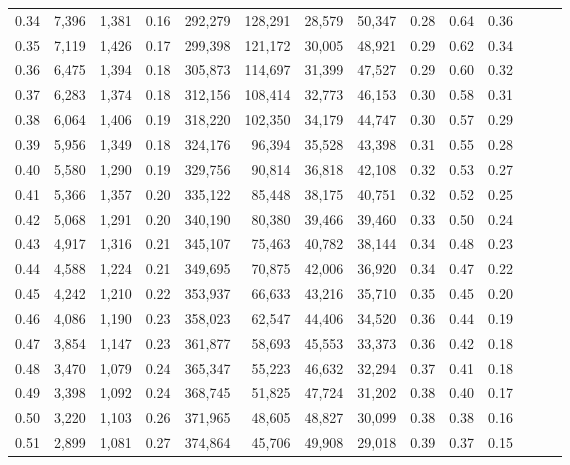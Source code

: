 \begin{tabular}{rrrrrrrrrrrrrr}
0.34 &   7,396 &  1,381 &  0.16 &  292,279 &  128,291 &  28,579 &  50,347 &  0.28 &  0.64 &      0.36 \\
0.35 &   7,119 &  1,426 &  0.17 &  299,398 &  121,172 &  30,005 &  48,921 &  0.29 &  0.62 &      0.34 \\
0.36 &   6,475 &  1,394 &  0.18 &  305,873 &  114,697 &  31,399 &  47,527 &  0.29 &  0.60 &      0.32 \\
0.37 &   6,283 &  1,374 &  0.18 &  312,156 &  108,414 &  32,773 &  46,153 &  0.30 &  0.58 &      0.31 \\
0.38 &   6,064 &  1,406 &  0.19 &  318,220 &  102,350 &  34,179 &  44,747 &  0.30 &  0.57 &      0.29 \\
0.39 &   5,956 &  1,349 &  0.18 &  324,176 &   96,394 &  35,528 &  43,398 &  0.31 &  0.55 &      0.28 \\
0.40 &   5,580 &  1,290 &  0.19 &  329,756 &   90,814 &  36,818 &  42,108 &  0.32 &  0.53 &      0.27 \\
0.41 &   5,366 &  1,357 &  0.20 &  335,122 &   85,448 &  38,175 &  40,751 &  0.32 &  0.52 &      0.25 \\
0.42 &   5,068 &  1,291 &  0.20 &  340,190 &   80,380 &  39,466 &  39,460 &  0.33 &  0.50 &      0.24 \\
0.43 &   4,917 &  1,316 &  0.21 &  345,107 &   75,463 &  40,782 &  38,144 &  0.34 &  0.48 &      0.23 \\
0.44 &   4,588 &  1,224 &  0.21 &  349,695 &   70,875 &  42,006 &  36,920 &  0.34 &  0.47 &      0.22 \\
0.45 &   4,242 &  1,210 &  0.22 &  353,937 &   66,633 &  43,216 &  35,710 &  0.35 &  0.45 &      0.20 \\
0.46 &   4,086 &  1,190 &  0.23 &  358,023 &   62,547 &  44,406 &  34,520 &  0.36 &  0.44 &      0.19 \\
0.47 &   3,854 &  1,147 &  0.23 &  361,877 &   58,693 &  45,553 &  33,373 &  0.36 &  0.42 &      0.18 \\
0.48 &   3,470 &  1,079 &  0.24 &  365,347 &   55,223 &  46,632 &  32,294 &  0.37 &  0.41 &      0.18 \\
0.49 &   3,398 &  1,092 &  0.24 &  368,745 &   51,825 &  47,724 &  31,202 &  0.38 &  0.40 &      0.17 \\
0.50 &   3,220 &  1,103 &  0.26 &  371,965 &   48,605 &  48,827 &  30,099 &  0.38 &  0.38 &      0.16 \\
0.51 &   2,899 &  1,081 &  0.27 &  374,864 &   45,706 &  49,908 &  29,018 &  0.39 &  0.37 &      0.15 \\

\end{tabular}
